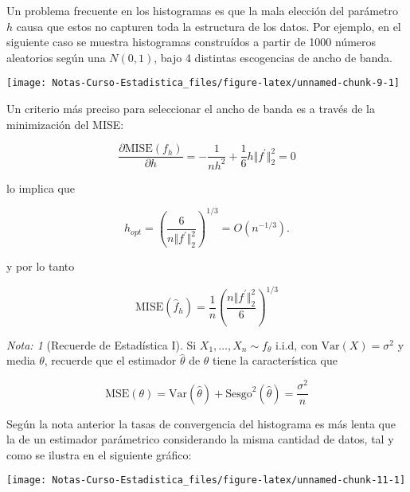 \documentclass[
  12pt,
]{book}
\theoremstyle{definition}
\theoremstyle{definition}
\theoremstyle{definition}
\theoremstyle{definition}
\theoremstyle{remark}
\newtheorem*{remark}{Nota: }
\begin{document}
Un problema frecuente en los histogramas es que la mala elección del parámetro \(h\) causa que estos no capturen toda la estructura de los datos. Por ejemplo, en el siguiente caso se muestra histogramas construídos a partir de 1000 números aleatorios según una \(N(0,1)\), bajo 4 distintas escogencias de ancho de banda.

\begin{center}\texttt{[image: Notas-Curso-Estadistica\_files/figure-latex/unnamed-chunk-9-1]} \end{center}

Un criterio más preciso para seleccionar el ancho de banda es a través de la minimización del MISE:

\begin{equation*}
\frac{\partial \mathrm{MISE}(f_{h})}{\partial h} = -\frac{1}{nh^2} + \frac{1}{6} h \Vert f^\prime\Vert_{2}^2 = 0
\end{equation*}

lo implica que

\begin{equation*}
h_{opt} = \left(\frac{6}{n\Vert f^\prime\Vert_{2}^2}\right) ^{1/3} = O\left( n^{-1/3} \right).
\end{equation*}

y por lo tanto

\begin{equation*}
\mathrm{MISE}(\hat{f}_{h}) = \frac{1}{n} \left(\frac{n\Vert f^\prime\Vert_{2}^2}{6}\right)  ^{1/3}
\end{equation*}

\begin{remark}[Recuerde de Estadística I]
Si \(X_1, \ldots, X_n \sim f_{\theta}\) i.i.d, con \(\mathrm{Var}(X) = \sigma^2\) y media \(\theta\), recuerde que el estimador \(\hat{\theta}\) de \(\theta\) tiene la característica que

\begin{equation*}
\mathrm{MSE}(\theta) = \mathrm{Var}(\hat{\theta}) +
\mathrm{Sesgo}^2(\hat{\theta}) = \frac{\sigma^2}{n}
\end{equation*}
\end{remark}

Según la nota anterior la tasas de convergencia del histograma es más lenta que la de un estimador parámetrico considerando la misma cantidad de datos, tal y como se ilustra en el siguiente gráfico:

\begin{center}\texttt{[image: Notas-Curso-Estadistica\_files/figure-latex/unnamed-chunk-11-1]} \end{center}
\end{document}
